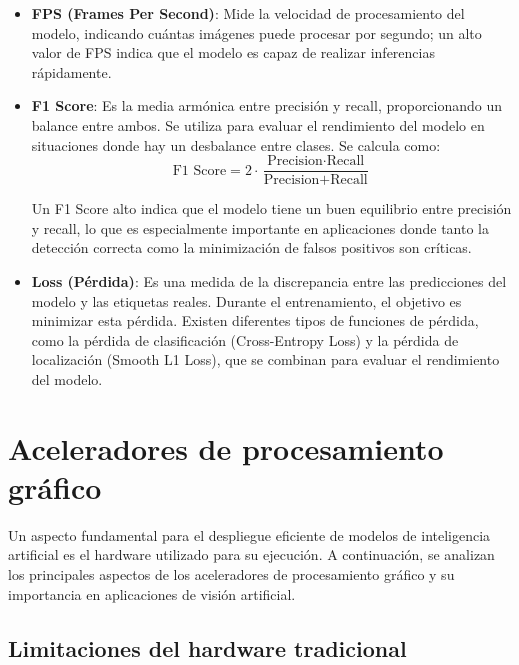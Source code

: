 \documentclass[11pt,spanish,listoffigures,listoftables]{tfgetsinf}
\begin{document}
\begin{itemize}
   \item \textbf{FPS (Frames Per Second)}: Mide la velocidad de procesamiento del modelo, indicando cuántas imágenes puede procesar por segundo; un alto valor de FPS indica que el modelo es capaz de realizar inferencias rápidamente.
   \item \textbf{F1 Score}: Es la media armónica entre precisión y recall, proporcionando un balance entre ambos. Se utiliza para evaluar el rendimiento del modelo en situaciones donde hay un desbalance entre clases. Se calcula como:
   \[
   \text{F1 Score} = 2 \cdot \frac{\text{Precision} \cdot \text{Recall}}{\text{Precision} + \text{Recall}}
   \]

   Un F1 Score alto indica que el modelo tiene un buen equilibrio entre precisión y recall, lo que es especialmente importante en aplicaciones donde tanto la detección correcta como la minimización de falsos positivos son críticas.

   \item \textbf{Loss (Pérdida)}: Es una medida de la discrepancia entre las predicciones del modelo y las etiquetas reales. Durante el entrenamiento, el objetivo es minimizar esta pérdida. Existen diferentes tipos de funciones de pérdida, como la pérdida de clasificación (Cross-Entropy Loss) y la pérdida de localización (Smooth L1 Loss), que se combinan para evaluar el rendimiento del modelo.

\end{itemize}


\section{Aceleradores de procesamiento gráfico} \label{sec:hardware}
Un aspecto fundamental para el despliegue eficiente de modelos de inteligencia artificial es el hardware utilizado para su ejecución. A continuación, se analizan los principales aspectos de los aceleradores de procesamiento gráfico y su importancia en aplicaciones de visión artificial.

\subsection{Limitaciones del hardware tradicional} \label{sec:limitaciones_hardware}
\end{document}

